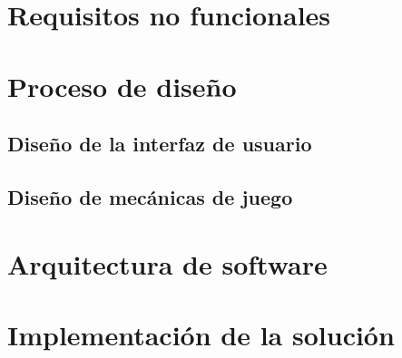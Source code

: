\section{Requisitos no funcionales}
\section{Proceso de diseño}
\subsection{Diseño de la interfaz de usuario}
\subsection{Diseño de mecánicas de juego}


\section{Arquitectura de software}

\section{Implementación de la solución}


